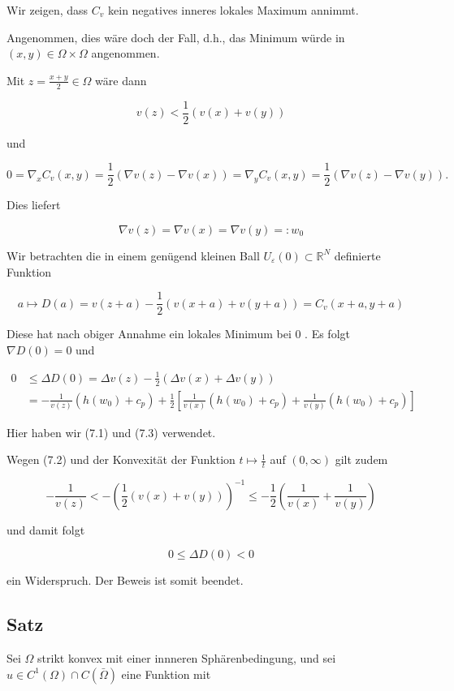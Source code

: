 \documentclass[10pt, letterpaper]{article}
\begin{document}
Wir zeigen, dass $C_{v}$ kein negatives inneres lokales Maximum annimmt.

Angenommen, dies wäre doch der Fall, d.h., das Minimum würde in $(x, y) \in \Omega \times \Omega$ angenommen.

Mit $z=\frac{x+y}{2} \in \Omega$ wäre dann

$$
v(z)<\frac{1}{2}(v(x)+v(y))
$$

und

$$
0=\nabla_{x} C_{v}(x, y)=\frac{1}{2}(\nabla v(z)-\nabla v(x))=\nabla_{y} C_{v}(x, y)=\frac{1}{2}(\nabla v(z)-\nabla v(y)) .
$$

Dies liefert

$$
\nabla v(z)=\nabla v(x)=\nabla v(y)=: w_{0}
$$

Wir betrachten die in einem genügend kleinen Ball $U_{\varepsilon}(0) \subset \mathbb{R}^{N}$ definierte Funktion

$$
a \mapsto D(a)=v(z+a)-\frac{1}{2}(v(x+a)+v(y+a))=C_{v}(x+a, y+a)
$$

Diese hat nach obiger Annahme ein lokales Minimum bei 0 . Es folgt $\nabla D(0)=0$ und

$$
\begin{aligned}
0 & \leq \Delta D(0)=\Delta v(z)-\frac{1}{2}(\Delta v(x)+\Delta v(y)) \\
& =-\frac{1}{v(z)}\left(h\left(w_{0}\right)+c_{p}\right)+\frac{1}{2}\left[\frac{1}{v(x)}\left(h\left(w_{0}\right)+c_{p}\right)+\frac{1}{v(y)}\left(h\left(w_{0}\right)+c_{p}\right)\right]
\end{aligned}
$$

Hier haben wir (7.1) und (7.3) verwendet.

Wegen (7.2) und der Konvexität der Funktion $t \mapsto \frac{1}{t}$ auf $(0, \infty)$ gilt zudem

$$
-\frac{1}{v(z)}<-\left(\frac{1}{2}(v(x)+v(y))\right)^{-1} \leq-\frac{1}{2}\left(\frac{1}{v(x)}+\frac{1}{v(y)}\right)
$$

und damit folgt

$$
0 \leq \Delta D(0)<0
$$

ein Widerspruch. Der Beweis ist somit beendet.

\subsection*{Satz}

Sei $\Omega$ strikt konvex mit einer innneren Sphärenbedingung, und sei $u \in C^{1}(\Omega) \cap C(\bar{\Omega})$ eine Funktion mit
\end{document}
